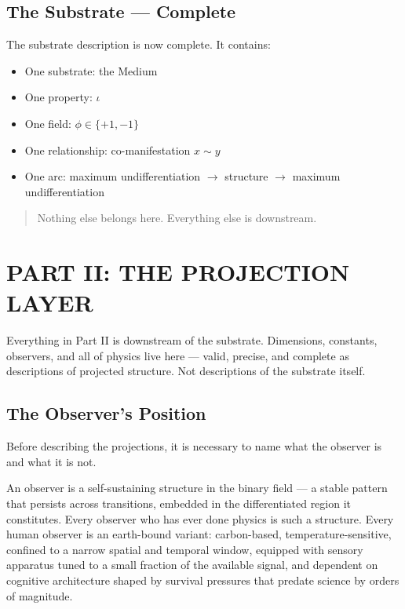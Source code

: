 \documentclass[11pt,letterpaper]{article}
\begin{document}
\subsection{The Substrate --- Complete}
\label{sec:orgeccfac7}

The substrate description is now complete. It contains:

\begin{itemize}
\item One substrate: the Medium
\item One property: \(\iota\)
\item One field: \(\phi \in \{+1, -1\}\)
\item One relationship: co-manifestation \(x \sim y\)
\item One arc: maximum undifferentiation \(\to\) structure \(\to\) maximum undifferentiation
\end{itemize}

\begin{quote}
Nothing else belongs here. Everything else is downstream.
\end{quote}
\section{PART II: THE PROJECTION LAYER}
\label{sec:org5358800}

Everything in Part II is downstream of the substrate. Dimensions, constants, observers, and all of physics live here --- valid, precise, and complete as descriptions of projected structure. Not descriptions of the substrate itself.
\subsection{The Observer's Position}
\label{sec:orge10ad7b}

Before describing the projections, it is necessary to name what the observer is and what it is not.

An observer is a self-sustaining structure in the binary field --- a stable pattern that persists across transitions, embedded in the differentiated region it constitutes. Every observer who has ever done physics is such a structure. Every human observer is an earth-bound variant: carbon-based, temperature-sensitive, confined to a narrow spatial and temporal window, equipped with sensory apparatus tuned to a small fraction of the available signal, and dependent on cognitive architecture shaped by survival pressures that predate science by orders of magnitude.
\end{document}
